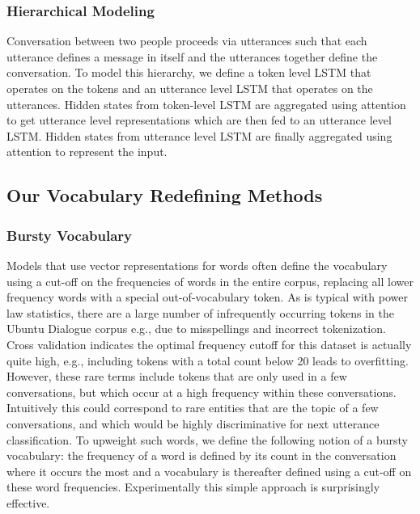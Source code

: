 \documentclass[11pt]{report}
\renewcommand\cite{\citep}	%
\begin{document}
\subsubsection{Hierarchical Modeling}

\noindent
Conversation between two people proceeds via utterances such that each utterance defines a message in itself and the utterances together define the conversation. To model this hierarchy, we define a token level LSTM that operates on the tokens and an utterance level LSTM that operates on the utterances. Hidden states from token-level LSTM are aggregated using attention to get utterance level representations which are then fed to an utterance level LSTM. Hidden states from utterance level LSTM are finally aggregated using attention to represent the input. %

\subsection{Our Vocabulary Redefining Methods}\label{our_methods}

\subsubsection{Bursty Vocabulary}\label{bursty_vocabulary}

Models that use vector representations for words often define the vocabulary using a cut-off on the frequencies of words in the entire corpus, replacing all lower frequency words with a special out-of-vocabulary token. As is typical with power law statistics, there are a large number of infrequently occurring tokens in the Ubuntu Dialogue corpus e.g., due to misspellings and incorrect tokenization.  Cross validation indicates the optimal frequency cutoff for this dataset is actually quite high, e.g., including tokens with a total count below 20 leads to overfitting. 
However, these rare terms include tokens that are only used in a few conversations, but which occur at a high frequency within these conversations.  Intuitively this could correspond to rare entities that are the topic of a few conversations, and which would be  highly discriminative for next utterance classification. To upweight such words, we define the following notion of a bursty vocabulary: the frequency of a word is defined by its count in the conversation where it occurs the most and a vocabulary is thereafter defined using a cut-off on these word frequencies.  Experimentally this simple approach is surprisingly effective.
\end{document}
